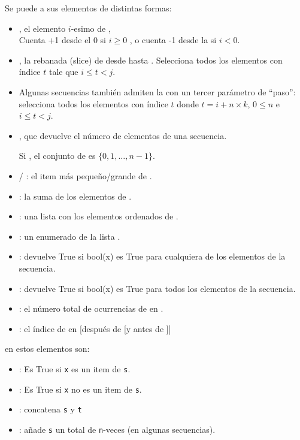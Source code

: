 Se puede  a sus elementos de distintas formas:
	\begin{itemize} 
	\item  {}, el elemento $i$-esimo de , \\
	Cuenta +1 desde el 0 si $i\geq 0$ , o cuenta -1 desde la  si $i<0$.
	\item  {},  la rebanada (slice) de  desde  hasta .  Selecciona todos los elementos con índice $t$ tale que $i \leq t <j$.
	\item Algunas secuencias también admiten la  con un tercer parámetro de ``paso'': \cm{[i:j:k]} selecciona todos los elementos con índice $t$ donde $t = i + n \times k$, $0\leq n$ e $i \leq t <j$.
	\end{itemize}





\begin{itemize}
\item {}, que devuelve el número de elementos de una secuencia.

Si , el conjunto de  es $\{0, 1, \ldots, n-1\}$.

\item {} / : el item más pequeño/grande de .   
\item {}: la suma de los elementos de .
\item {}: una lista con los elementos ordenados de .
\item {}: un enumerado de la lista .
\item {}: devuelve True si bool(x) es True para cualquiera de los elementos de la secuencia.
\item {}: devuelve True si bool(x) es True para todos los elementos de la secuencia.
\end{itemize}


\begin{itemize}
\item {}: el número total de ocurrencias de  en .
\item {}: el índice de  en  [después de  [y antes de ]]
\end{itemize}

 en estos elementos son:
\begin{itemize}
\item {}: Es True si {\tt x} es un item de {\tt s}.
\item {}: Es True si {\tt x} no es un item de {\tt s}.
\item  {}: concatena {\tt s} y {\tt t} 
\item {}: añade {\tt s} un total de {\tt n}-veces (en algunas secuencias).
\end{itemize}




